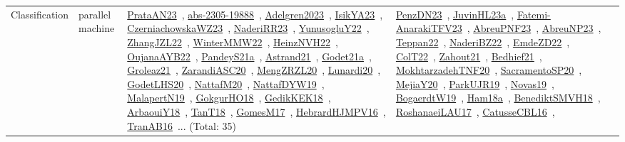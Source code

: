 {\begin{longtable}{lp{3cm}>{\raggedright\arraybackslash}p{6cm}>{\raggedright\arraybackslash}p{6cm}>{\raggedright\arraybackslash}p{8cm}}
Classification & parallel machine & \href{../works/PrataAN23.pdf}{PrataAN23}~\cite{PrataAN23}, \href{../works/abs-2305-19888.pdf}{abs-2305-19888}~\cite{abs-2305-19888}, \href{../works/Adelgren2023.pdf}{Adelgren2023}~\cite{Adelgren2023}, \href{../works/IsikYA23.pdf}{IsikYA23}~\cite{IsikYA23}, \href{../works/CzerniachowskaWZ23.pdf}{CzerniachowskaWZ23}~\cite{CzerniachowskaWZ23}, \href{../works/NaderiRR23.pdf}{NaderiRR23}~\cite{NaderiRR23}, \href{../works/YunusogluY22.pdf}{YunusogluY22}~\cite{YunusogluY22}, \href{../works/ZhangJZL22.pdf}{ZhangJZL22}~\cite{ZhangJZL22}, \href{../works/WinterMMW22.pdf}{WinterMMW22}~\cite{WinterMMW22}, \href{../works/HeinzNVH22.pdf}{HeinzNVH22}~\cite{HeinzNVH22}, \href{../works/OujanaAYB22.pdf}{OujanaAYB22}~\cite{OujanaAYB22}, \href{../works/PandeyS21a.pdf}{PandeyS21a}~\cite{PandeyS21a}, \href{../works/Astrand21.pdf}{Astrand21}~\cite{Astrand21}, \href{../works/Godet21a.pdf}{Godet21a}~\cite{Godet21a}, \href{../works/Groleaz21.pdf}{Groleaz21}~\cite{Groleaz21}, \href{../works/ZarandiASC20.pdf}{ZarandiASC20}~\cite{ZarandiASC20}, \href{../works/MengZRZL20.pdf}{MengZRZL20}~\cite{MengZRZL20}, \href{../works/Lunardi20.pdf}{Lunardi20}~\cite{Lunardi20}, \href{../works/GodetLHS20.pdf}{GodetLHS20}~\cite{GodetLHS20}, \href{../works/NattafM20.pdf}{NattafM20}~\cite{NattafM20}, \href{../works/NattafDYW19.pdf}{NattafDYW19}~\cite{NattafDYW19}, \href{../works/MalapertN19.pdf}{MalapertN19}~\cite{MalapertN19}, \href{../works/GokgurHO18.pdf}{GokgurHO18}~\cite{GokgurHO18}, \href{../works/GedikKEK18.pdf}{GedikKEK18}~\cite{GedikKEK18}, \href{../works/ArbaouiY18.pdf}{ArbaouiY18}~\cite{ArbaouiY18}, \href{../works/TanT18.pdf}{TanT18}~\cite{TanT18}, \href{../works/GomesM17.pdf}{GomesM17}~\cite{GomesM17}, \href{../works/HebrardHJMPV16.pdf}{HebrardHJMPV16}~\cite{HebrardHJMPV16}, \href{../works/TranAB16.pdf}{TranAB16}~\cite{TranAB16}... (Total: 35) & \href{../works/PenzDN23.pdf}{PenzDN23}~\cite{PenzDN23}, \href{../works/JuvinHL23a.pdf}{JuvinHL23a}~\cite{JuvinHL23a}, \href{../works/Fatemi-AnarakiTFV23.pdf}{Fatemi-AnarakiTFV23}~\cite{Fatemi-AnarakiTFV23}, \href{../works/AbreuPNF23.pdf}{AbreuPNF23}~\cite{AbreuPNF23}, \href{../works/AbreuNP23.pdf}{AbreuNP23}~\cite{AbreuNP23}, \href{../works/Teppan22.pdf}{Teppan22}~\cite{Teppan22}, \href{../works/NaderiBZ22.pdf}{NaderiBZ22}~\cite{NaderiBZ22}, \href{../works/EmdeZD22.pdf}{EmdeZD22}~\cite{EmdeZD22}, \href{../works/ColT22.pdf}{ColT22}~\cite{ColT22}, \href{../works/Zahout21.pdf}{Zahout21}~\cite{Zahout21}, \href{../works/Bedhief21.pdf}{Bedhief21}~\cite{Bedhief21}, \href{../works/MokhtarzadehTNF20.pdf}{MokhtarzadehTNF20}~\cite{MokhtarzadehTNF20}, \href{../works/SacramentoSP20.pdf}{SacramentoSP20}~\cite{SacramentoSP20}, \href{../works/MejiaY20.pdf}{MejiaY20}~\cite{MejiaY20}, \href{../works/ParkUJR19.pdf}{ParkUJR19}~\cite{ParkUJR19}, \href{../works/Novas19.pdf}{Novas19}~\cite{Novas19}, \href{../works/BogaerdtW19.pdf}{BogaerdtW19}~\cite{BogaerdtW19}, \href{../works/Ham18a.pdf}{Ham18a}~\cite{Ham18a}, \href{../works/BenediktSMVH18.pdf}{BenediktSMVH18}~\cite{BenediktSMVH18}, \href{../works/RoshanaeiLAU17.pdf}{RoshanaeiLAU17}~\cite{RoshanaeiLAU17}, \href{../works/CatusseCBL16.pdf}{CatusseCBL16}~\cite{CatusseCBL16}, 
\end{longtable}}
